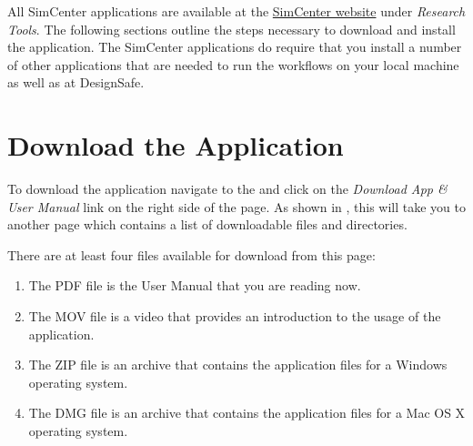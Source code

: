 All SimCenter applications are available at
the \href{https://simcenter.designsafe-ci.org/research-tools/overview/}{SimCenter
website} under \emph{Research Tools}. The following sections outline
the steps necessary to download and install the \texttt{\getsoftwarename{}}
application. The SimCenter applications do require that you install a
number of other applications that are needed to run the workflows on
your local machine as well as at DesignSafe. \\


\section{Download the Application}


To download the \texttt{\getsoftwarename{}} application navigate to
the  and click on
the \emph{Download App \& User Manual} link on the right side of the
page. As shown in , this will take you to another page which contains a list of downloadable files and directories.





There are at least four files available for download from this page: 
\begin{enumerate}
    \item The PDF file is the User Manual that you are reading now.
    \item The MOV file is a video that provides an introduction to the usage of the application.
    \item The ZIP file is an archive that contains the application files for a Windows operating system.
    \item The DMG file is an archive that contains the application files for a Mac OS X operating system.
\end{enumerate}

